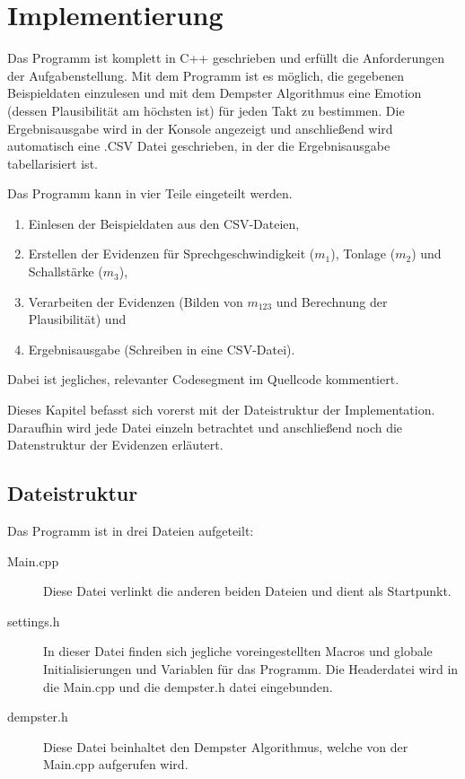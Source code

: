 \chapter{Implementierung}
\label{implementation}
Das Programm ist komplett in C++ geschrieben und erfüllt die Anforderungen der Aufgabenstellung. Mit dem Programm ist es möglich, die gegebenen Beispieldaten einzulesen und mit dem Dempster Algorithmus eine Emotion (dessen Plausibilität am höchsten ist) für jeden Takt zu bestimmen. 
Die Ergebnisausgabe wird in der Konsole angezeigt und anschließend wird automatisch eine .CSV Datei geschrieben, in der die Ergebnisausgabe tabellarisiert ist. 


Das Programm kann in vier Teile eingeteilt werden.

\begin{enumerate}
  \item Einlesen der Beispieldaten aus den CSV-Dateien,
  \item Erstellen der Evidenzen für Sprechgeschwindigkeit (\(m_1\)), Tonlage (\(m_2\)) und Schallstärke (\(m_3\)),
  \item Verarbeiten der Evidenzen (Bilden von \(m_{123}\) und Berechnung der Plausibilität) und
  \item Ergebnisausgabe (Schreiben in eine CSV-Datei).
\end{enumerate}

Dabei ist jegliches, relevanter Codesegment im Quellcode kommentiert. 

Dieses Kapitel befasst sich vorerst mit der Dateistruktur der Implementation. Daraufhin wird jede Datei einzeln betrachtet und anschließend noch die Datenstruktur der Evidenzen erläutert.  

\section{Dateistruktur}
Das Programm ist in drei Dateien aufgeteilt:

\begin{description}
  \item [Main.cpp] Diese Datei verlinkt die anderen beiden Dateien und dient als Startpunkt. 
  \item [settings.h] In dieser Datei finden sich jegliche voreingestellten Macros und globale Initialisierungen und Variablen für das Programm. Die Headerdatei wird in die Main.cpp und die dempster.h datei eingebunden.
  \item [dempster.h] Diese Datei beinhaltet den Dempster Algorithmus, welche von der Main.cpp aufgerufen wird.
  \end{description}

